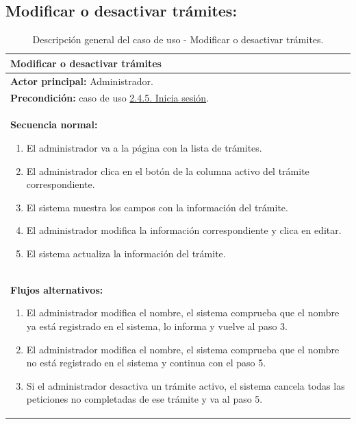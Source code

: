 \documentclass[12pt, a4paper, twoside]{report}
\begin{document}
        \subsection{Modificar o desactivar trámites:}
            \begin{table}[H]
            \centering
            \begin{tabular}{|p{16cm}|} 
            \hline
            \textbf{Modificar o desactivar trámites} \\ \hline
            \textbf{Actor principal:} Administrador. \\ \hline
            \textbf{Precondición:} caso de uso \hyperref[subsec:2.4.5.]{2.4.5. Inicia sesión}. \\ \hline
            \textbf{Secuencia normal:}
                \begin{enumerate}
                    \item El administrador va a la página con la lista de trámites.
                    \item El administrador clica en el botón de la columna activo del trámite correspondiente.
                    \item El sistema muestra los campos con la información del trámite.
                    \item El administrador modifica la información correspondiente y clica en editar.
                    \item El sistema actualiza la información del trámite.
                \end{enumerate} \\ \hline
            \textbf{Flujos alternativos:}
                \begin{enumerate}
                    \item[4.a.] El administrador modifica el nombre, el sistema comprueba que el nombre ya está registrado en el sistema, lo informa y vuelve al paso 3.
                    \item[4.b.] El administrador modifica el nombre, el sistema comprueba que el nombre no está registrado en el sistema y continua con el paso 5.
                    \item[4.c.] Si el administrador desactiva un trámite activo, el sistema cancela todas las peticiones no completadas de ese trámite y va al paso 5.
                \end{enumerate} \\ \hline
            \end{tabular}
            \caption{Descripción general del caso de uso - Modificar o desactivar trámites.}
            \end{table}
    
\end{document}
